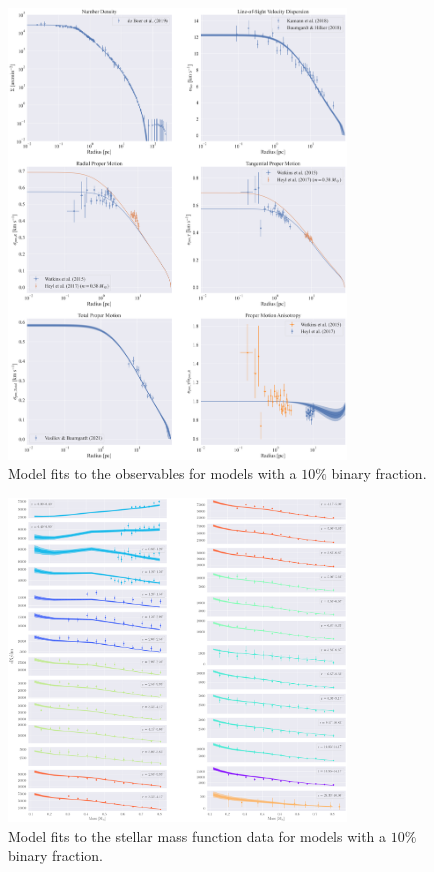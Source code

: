 \begin{figure}
	\centering
	\includegraphics[width=0.8\textwidth]{figures/high_bin_model/obs_panel.png}
	\caption{Model fits to the observables for models with a $10\%$ binary fraction.}
	\label{fig:highbin_obs_panel}
\end{figure}


\begin{figure}
	\centering
	\includegraphics[width=0.8\textwidth]{figures/high_bin_model/mass_fun.png}
	\caption{Model fits to the stellar mass function data for models with a $10\%$ binary fraction.}
	\label{fig:highbin_mass_fun}
\end{figure}




